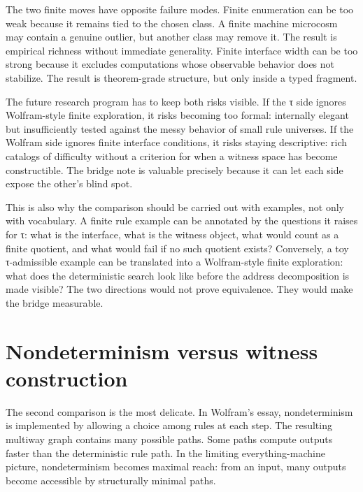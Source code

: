 \documentclass{pantarhei-researchnote}
\begin{document}
The two finite moves have opposite failure modes. Finite enumeration can
be too weak because it remains tied to the chosen class. A finite machine
microcosm may contain a genuine outlier, but another class may remove it.
The result is empirical richness without immediate generality. Finite
interface width can be too strong because it excludes computations whose
observable behavior does not stabilize. The result is theorem-grade
structure, but only inside a typed fragment.

The future research program has to keep both risks visible. If the τ
side ignores Wolfram-style finite exploration, it risks becoming too
formal: internally elegant but insufficiently tested against the messy
behavior of small rule universes. If the Wolfram side ignores finite
interface conditions, it risks staying descriptive: rich catalogs of
difficulty without a criterion for when a witness space has become
constructible. The bridge note is valuable precisely because it can let
each side expose the other's blind spot.

This is also why the comparison should be carried out with examples,
not only with vocabulary. A finite rule example can be annotated by the
questions it raises for τ: what is the interface, what is the witness
object, what would count as a finite quotient, and what would fail if no
such quotient exists? Conversely, a toy τ-admissible example can be
translated into a Wolfram-style finite exploration: what does the
deterministic search look like before the address decomposition is made
visible? The two directions would not prove equivalence. They would make
the bridge measurable.

\section{Nondeterminism versus witness construction}
\label{sec:nondeterminism}

The second comparison is the most delicate. In Wolfram's essay,
nondeterminism is implemented by allowing a choice among rules at each
step. The resulting multiway graph contains many possible paths. Some
paths compute outputs faster than the deterministic rule path. In the
limiting everything-machine picture, nondeterminism becomes maximal reach:
from an input, many outputs become accessible by structurally minimal
paths.
\end{document}
